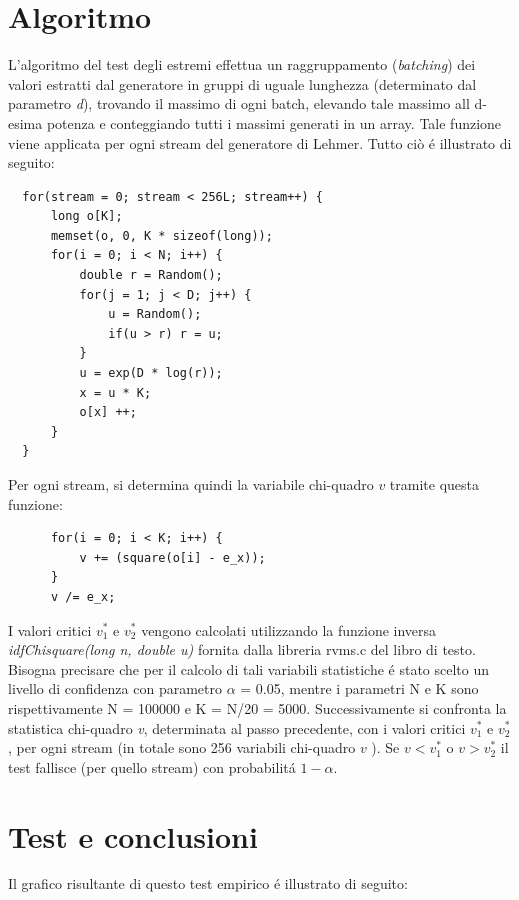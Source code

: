 \section{Algoritmo}
L'algoritmo del test degli estremi effettua un raggruppamento (\textit{batching}) dei 
valori estratti dal generatore in gruppi di uguale lunghezza (determinato dal 
parametro \textit{d}), trovando il 
massimo di ogni batch, elevando tale massimo all d-esima potenza e conteggiando 
tutti i massimi generati in un array. Tale funzione viene applicata per ogni 
stream del generatore di Lehmer.
Tutto ci\`o \'e illustrato di seguito:
\begin{verbatim}
  for(stream = 0; stream < 256L; stream++) {
      long o[K];
      memset(o, 0, K * sizeof(long));
      for(i = 0; i < N; i++) {
          double r = Random();
          for(j = 1; j < D; j++) {
              u = Random();
              if(u > r) r = u;
          }
          u = exp(D * log(r));
          x = u * K;
          o[x] ++;
      }
  }
\end{verbatim}
Per ogni stream, si determina quindi la variabile chi-quadro $v$ tramite questa 
funzione:
\begin{verbatim}
      for(i = 0; i < K; i++) {
	      v += (square(o[i] - e_x));
      }
      v /= e_x;
\end{verbatim}

I valori critici $v_1^{*}$ e $v_2^{*}$ vengono calcolati utilizzando la funzione inversa 
\textit{idfChisquare(long n, double u)}  fornita dalla libreria rvms.c del libro di 
testo. Bisogna precisare che per il calcolo 
di tali variabili statistiche \'e stato scelto un livello di confidenza con 
parametro $\alpha$ = 0.05, mentre i parametri N e K sono rispettivamente N = 100000 
e K = N/20 = 5000.
Successivamente si confronta la statistica chi-quadro \textit{v}, determinata al passo 
precedente, con i valori critici  $v_1^{*}$ e $v_2^{*}$ , per ogni stream (in totale sono 256 
variabili chi-quadro $v$ ).
Se $v < v_1^{*}$ o $v > v_2^{*}$ il test fallisce (per quello stream) con probabilit\'a $1 - 
\alpha$.

\section{Test e conclusioni}
\noindent Il grafico risultante di questo test empirico \'e illustrato di seguito:

